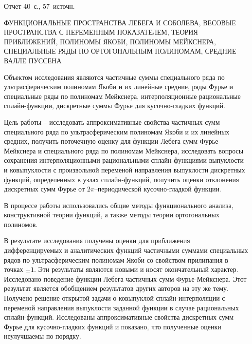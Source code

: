 \Referat %
Отчет 40~с., 57~источн.

ФУНКЦИОНАЛЬНЫЕ ПРОСТРАНСТВА ЛЕБЕГА И СОБОЛЕВА,
ВЕСОВЫЕ ПРОСТРАНСТВА С ПЕРЕМЕННЫМ ПОКАЗАТЕЛЕМ,
ТЕОРИЯ ПРИБЛИЖЕНИЙ,
ПОЛИНОМЫ ЯКОБИ,
ПОЛИНОМЫ МЕЙКСНЕРА,
СПЕЦИАЛЬНЫЕ РЯДЫ ПО ОРТОГОНАЛЬНЫМ ПОЛИНОМАМ,
СРЕДНИЕ ВАЛЛЕ ПУССЕНА


Объектом исследования являются частичные суммы специального ряда по ультрасферическим полиномам Якоби и их линейные средние, ряды Фурье и специальные ряды по полиномам Мейкснера, интерполяционные рациональные сплайн-функции, дискретные суммы Фурье для кусочно-гладких функций.

Цель работы -- исследовать аппроксимативные свойства частичных сумм специального ряда по ультрасферическим полиномам Якоби и их линейных средних, получить поточечную оценку для функции Лебега сумм Фурье-Мейкснера и специального ряда по полиномам Мейкснера, исследовать вопросы сохранения интерполяционными рациональными
сплайн-функциями выпуклости и ковыпуклости с произвольной переменой направления выпуклости дискретных функций, определенных в узлах сплайн-функций, получить оценки отклонения дискретных сумм Фурье от $2\pi$--периодической кусочно-гладкой функции.

В процессе работы использовались общие методы функционального анализа, конструктивной теории функций, а также методы теории ортогональных полиномов.

В результате исследования получены оценки для приближения дифференцируемых и аналитических функций частичными суммами специальных рядов по ультрасферическим полиномам Якоби со свойством прилипания в точках $\pm1$. Эти результаты являются новыми и носят окончательный характер.
Исследовано поведение функции Лебега частичных сумм Фурье-Мейкснера. Этот результат является обобщением результатов других авторов на эту же тему.
Получено решение открытой задачи о ковыпуклой сплайн-интерполяции с переменой направления выпуклости заданной функции в случае рациональных сплайн-функций.
Исследованы аппроксимативные свойства дискретных сумм Фурье для кусочно-гладких функций и показано, что полученные оценки неулучшаемы по порядку.

